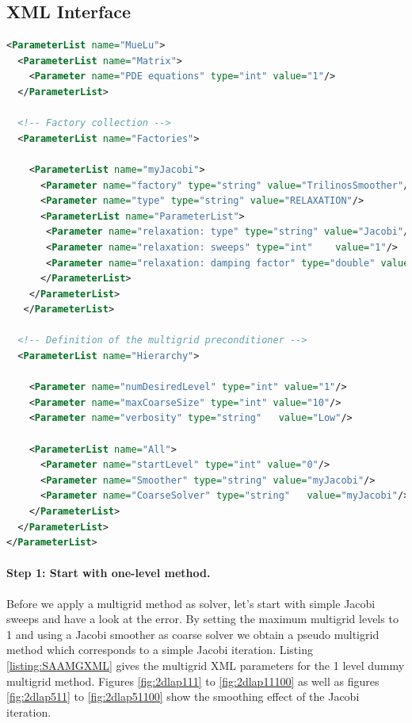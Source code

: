 \documentclass[12pt,a4paper]{article}
\newcommand{\MueLu}{MueLu}
\begin{document}

\subsection{XML Interface}

\begin{Listing} 
\begin{center} 
\begin{lstlisting}[language=XML,label=listing:SAAMGXML]
<ParameterList name="MueLu">
  <ParameterList name="Matrix">
    <Parameter name="PDE equations" type="int" value="1"/> 
  </ParameterList>

  <!-- Factory collection -->
  <ParameterList name="Factories">
     
    <ParameterList name="myJacobi">
      <Parameter name="factory" type="string" value="TrilinosSmoother"/>
      <Parameter name="type" type="string" value="RELAXATION"/>
      <ParameterList name="ParameterList">
       <Parameter name="relaxation: type" type="string" value="Jacobi"/>
       <Parameter name="relaxation: sweeps" type="int"    value="1"/>
       <Parameter name="relaxation: damping factor" type="double" value="0.9"/>
      </ParameterList>
    </ParameterList>
   </ParameterList>

  <!-- Definition of the multigrid preconditioner -->
  <ParameterList name="Hierarchy">

    <Parameter name="numDesiredLevel" type="int" value="1"/> 
    <Parameter name="maxCoarseSize" type="int" value="10"/>
    <Parameter name="verbosity" type="string"   value="Low"/>

    <ParameterList name="All">
      <Parameter name="startLevel" type="int" value="0"/>
      <Parameter name="Smoother" type="string" value="myJacobi"/>
      <Parameter name="CoarseSolver" type="string"   value="myJacobi"/>    
    </ParameterList>
  </ParameterList>
</ParameterList>
\end{lstlisting}
\caption{Structure of XML input file for \MueLu~ with smoothed aggregation transfer operators and Jacobi level smoothers.} 
\label{listing:SAAMGXML}
\end{center}
\end{Listing}

\paragraph{Step 1: Start with one-level method.}
Before we apply a multigrid method as solver, let's start with simple Jacobi sweeps and have a look at the error.
By setting the maximum multigrid levels to 1 and using a Jacobi smoother as coarse solver we obtain a pseudo multigrid method which corresponds to a simple Jacobi iteration. Listing \ref{listing:SAAMGXML} gives the multigrid XML parameters for the 1 level dummy multigrid method. Figures \ref{fig:2dlap111} to \ref{fig:2dlap11100} as well as figures \ref{fig:2dlap511} to \ref{fig:2dlap51100} show the smoothing effect of the Jacobi iteration.
\end{document}

